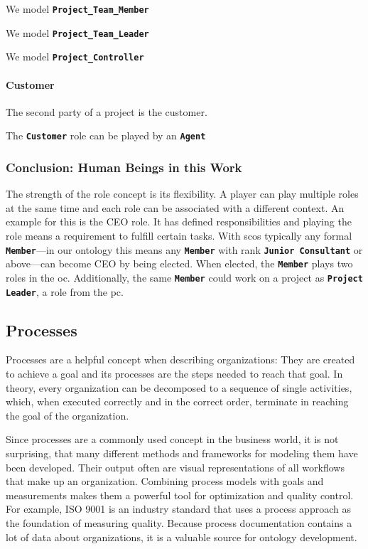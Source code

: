 \documentclass[a4paper, DIV=13, BCOR=0cm]{scrbook}
\newcommand{\class}[1]{\texttt{\textbf{#1}}}
\begin{document}
We model \class{Project\_Team\_Member}

We model \class{Project\_Team\_Leader}

We model \class{Project\_Controller}

\paragraph{Customer}
The second party of a project is the customer.

The \class{Customer} role can be played by an \class{Agent}


\subsubsection{Conclusion: Human Beings in this Work }


The strength of the role concept is its flexibility. A player can play multiple roles at the same time and each role can be associated with a different context. An example for this is the CEO role. It has defined responsibilities and playing the role means a requirement to fulfill certain tasks. With \glspl{sco} typically any formal \class{Member}---in our ontology this means any \class{Member} with rank \class{Junior Consultant} or above---can become CEO by being elected. When elected, the \class{Member} plays two roles in the \gls{oc}. Additionally, the same \class{Member} could work on a project as \class{Project Leader}, a role from the \gls{pc}.



\subsection{Processes }
Processes are a helpful concept when describing organizations: They are created to achieve a goal and its processes are the steps needed to reach that goal. \cite[p.\,5, Definition 1.1]{Weske:2019aa} In theory, every organization can be decomposed to a sequence of single activities, which, when executed correctly and in the correct order, terminate in reaching the goal of the organization.

Since processes are a commonly used concept in the business world, it is not surprising, that many different methods and frameworks for modeling them have been developed. Their output often are visual representations of all workflows that make up an organization. Combining process models with goals and measurements makes them a powerful tool for optimization and quality control. For example, ISO 9001 is an industry standard that uses a process approach as the foundation of measuring quality. \cite{iso-process-approach} Because process documentation contains a lot of data about organizations, it is a valuable source for ontology development.
\end{document}
